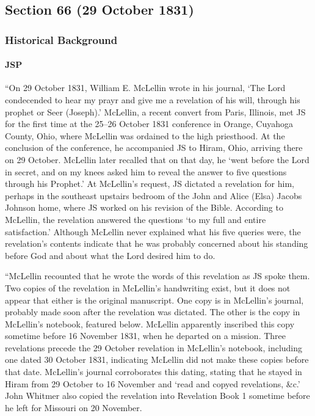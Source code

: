 \subsection{Section 66 (29 October 1831)}
	\label{DC66}
	
	\subsubsection{Historical Background}
		\label{DC66-HB}
		
		\paragraph{JSP}
		
			``On 29 October 1831, William E. McLellin wrote in his journal, `The Lord condecended to hear my prayr and give me a revelation of his will, through his prophet or Seer (Joseph).' McLellin, a recent convert from Paris, Illinois, met JS for the first time at the 25--26 October 1831 conference in Orange, Cuyahoga County, Ohio, where McLellin was ordained to the high priesthood. At the conclusion of the conference, he accompanied JS to Hiram, Ohio, arriving there on 29 October. McLellin later recalled that on that day, he `went before the Lord in secret, and on my knees asked him to reveal the answer to five questions through his Prophet.' At McLellin's request, JS dictated a revelation for him, perhaps in the southeast upstairs bedroom of the John and Alice (Elsa) Jacobs Johnson home, where JS worked on his revision of the Bible. According to McLellin, the revelation answered the questions `to my full and entire satisfaction.' Although McLellin never explained what his five queries were, the revelation's contents indicate that he was probably concerned about his standing before God and about what the Lord desired him to do.
			
			``McLellin recounted that he wrote the words of this revelation as JS spoke them. Two copies of the revelation in McLellin's handwriting exist, but it does not appear that either is the original manuscript. One copy is in McLellin's journal, probably made soon after the revelation was dictated. The other is the copy in McLellin's notebook, featured below. McLellin apparently inscribed this copy sometime before 16 November 1831, when he departed on a mission. Three revelations precede the 29 October revelation in McLellin's notebook, including one dated 30 October 1831, indicating McLellin did not make these copies before that date. McLellin's journal corroborates this dating, stating that he stayed in Hiram from 29 October to 16 November and `read and copyed revelations, \&c.' John Whitmer also copied the revelation into Revelation Book 1 sometime before he left for Missouri on 20 November.
			
